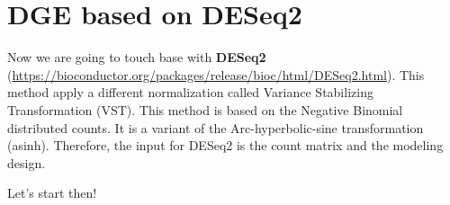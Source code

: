 \documentclass[]{book}
\newenvironment{Shaded}{\begin{snugshade}}{\end{snugshade}}
\newcommand{\CommentTok}[1]{\textcolor[rgb]{0.56,0.35,0.01}{\textit{#1}}}
\newcommand{\DataTypeTok}[1]{\textcolor[rgb]{0.13,0.29,0.53}{#1}}
\newcommand{\DecValTok}[1]{\textcolor[rgb]{0.00,0.00,0.81}{#1}}
\newcommand{\FloatTok}[1]{\textcolor[rgb]{0.00,0.00,0.81}{#1}}
\newcommand{\KeywordTok}[1]{\textcolor[rgb]{0.13,0.29,0.53}{\textbf{#1}}}
\newcommand{\NormalTok}[1]{#1}
\newcommand{\OperatorTok}[1]{\textcolor[rgb]{0.81,0.36,0.00}{\textbf{#1}}}
\newcommand{\StringTok}[1]{\textcolor[rgb]{0.31,0.60,0.02}{#1}}
\begin{document}
\hypertarget{htmlwidget-d17cf4080686b93cfbc9}{}

\begin{Shaded}
\end{Shaded}

\hypertarget{htmlwidget-973e359619ea20b8fc9c}{}

\hypertarget{dge-based-on-deseq2}{%
\section{DGE based on DESeq2}\label{dge-based-on-deseq2}}

Now we are going to touch base with \textbf{DESeq2} (\url{https://bioconductor.org/packages/release/bioc/html/DESeq2.html}). This method apply a different normalization called Variance Stabilizing Transformation (VST). This method is based on the Negative Binomial distributed counts. It is a variant of the Arc-hyperbolic-sine transformation (asinh).
Therefore, the input for DESeq2 is the count matrix and the modeling design.

Let's start then!
\end{document}

